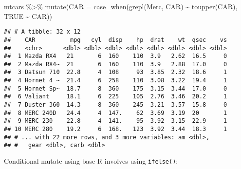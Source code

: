 \documentclass[
]{book}
\newenvironment{Shaded}{\begin{snugshade}}{\end{snugshade}}
\newcommand{\AttributeTok}[1]{\textcolor[rgb]{0.77,0.63,0.00}{#1}}
\newcommand{\ConstantTok}[1]{\textcolor[rgb]{0.00,0.00,0.00}{#1}}
\newcommand{\DecValTok}[1]{\textcolor[rgb]{0.00,0.00,0.81}{#1}}
\newcommand{\FunctionTok}[1]{\textcolor[rgb]{0.00,0.00,0.00}{#1}}
\newcommand{\NormalTok}[1]{#1}
\newcommand{\OtherTok}[1]{\textcolor[rgb]{0.56,0.35,0.01}{#1}}
\newcommand{\SpecialCharTok}[1]{\textcolor[rgb]{0.00,0.00,0.00}{#1}}
\newcommand{\StringTok}[1]{\textcolor[rgb]{0.31,0.60,0.02}{#1}}
\begin{document}
\begin{Shaded}
\begin{Highlighting}[]
\NormalTok{mtcars }\SpecialCharTok{\%\textgreater{}\%} \FunctionTok{mutate}\NormalTok{(}\AttributeTok{CAR =} \FunctionTok{case\_when}\NormalTok{(}\FunctionTok{grepl}\NormalTok{(}\StringTok{\textquotesingle{}Merc\textquotesingle{}}\NormalTok{, CAR) }\SpecialCharTok{\textasciitilde{}} \FunctionTok{toupper}\NormalTok{(CAR), }\ConstantTok{TRUE} \SpecialCharTok{\textasciitilde{}}\NormalTok{ CAR))}
\end{Highlighting}
\end{Shaded}

\begin{verbatim}
## # A tibble: 32 x 12
##    CAR          mpg   cyl  disp    hp  drat    wt  qsec    vs
##    <chr>      <dbl> <dbl> <dbl> <dbl> <dbl> <dbl> <dbl> <dbl>
##  1 Mazda RX4   21       6  160    110  3.9   2.62  16.5     0
##  2 Mazda RX4~  21       6  160    110  3.9   2.88  17.0     0
##  3 Datsun 710  22.8     4  108     93  3.85  2.32  18.6     1
##  4 Hornet 4 ~  21.4     6  258    110  3.08  3.22  19.4     1
##  5 Hornet Sp~  18.7     8  360    175  3.15  3.44  17.0     0
##  6 Valiant     18.1     6  225    105  2.76  3.46  20.2     1
##  7 Duster 360  14.3     8  360    245  3.21  3.57  15.8     0
##  8 MERC 240D   24.4     4  147.    62  3.69  3.19  20       1
##  9 MERC 230    22.8     4  141.    95  3.92  3.15  22.9     1
## 10 MERC 280    19.2     6  168.   123  3.92  3.44  18.3     1
## # ... with 22 more rows, and 3 more variables: am <dbl>,
## #   gear <dbl>, carb <dbl>
\end{verbatim}

Conditional mutate using base R involves using \texttt{ifelse()}:

\begin{Shaded}
\end{Shaded}
\end{document}

